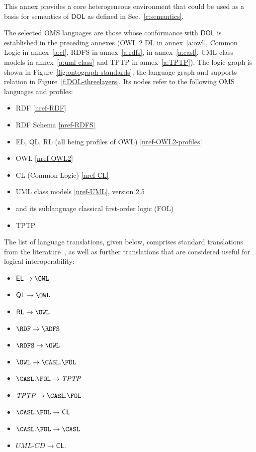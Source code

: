 \documentclass[10pt, a4paper]{isov2}
\newcommand*{\CL}{\ensuremath{\mathsf{CL}}\xspace}
\newcommand{\QL}{\ensuremath{\mathsf{QL}}\xspace}
\newcommand{\RL}{\ensuremath{\mathsf{RL}}\xspace}
\newcommand{\EL}{\ensuremath{\mathsf{EL}}\xspace}
\newcommand*{\DOL}{\ensuremath{\mathsf{DOL}}\xspace}
\renewcommand{\annexrefname}{annex}
\renewcommand{\figurerefname}{Figure}
\renewcommand{\noterefname}{note}
\renewcommand{\aref}[1]{\annexrefname~\ref{#1}}
\renewcommand{\fref}[1]{\figurerefname~\ref{#1}}
\renewcommand{\nref}[1]{\noterefname~\ref{#1}}
\renewcommand{\nref}[1]{\ref{nref-#1}}
\begin{document}
This annex provides a core heterogeneous environment that could be used as a basis for 
semantics of \DOL as defined in Sec.~\ref{c:semantics}.



 
The selected OMS languages are those whose conformance with \DOL is
established in the preceding annexes (OWL 2 DL in \aref{a:owl}, Common
Logic in \aref{a:cl}, RDFS in \aref{a:rdfs}, \CASL in \aref{a:casl}, UML
class models in \aref{a:uml-class} and TPTP in \aref{a:TPTP}).  The
logic graph is shown in \fref{fig:ontograph-standards}; the language
graph and supports relation in \fref{f:DOL-threelayers}.  Its nodes
refer to the following OMS languages and profiles:
\begin{itemize}
\item RDF \nref{RDF}
\item RDF Schema \nref{RDFS}
\item EL, QL, RL (all being profiles of OWL) \nref{OWL2-profiles}
\item OWL \nref{OWL2}
\item CL (Common Logic) \nref{CL}
\item UML class models \nref{UML}, version 2.5
\item \CASL \cite{CASL-RM} and its sublanguage classical first-order logic (FOL)
\item TPTP
\end{itemize}

The list of language translations, given below, comprises standard
translations from the literature~\cite{OntoGraph,MossakowskiEtAl14b}, as
well as further translations that are considered useful for logical
interoperability:
\begin{itemize}
  \item $\EL \to \OWL$ 
  \item $\QL \to \OWL$
  \item $\RL \to \OWL$
  \item $\RDF \to \RDFS$
  \item $\RDFS \to \OWL$
  \item $\OWL  \to \CASL.\FOL$
  \item $\CASL.\FOL \to \mathit{TPTP}$
  \item $\mathit{TPTP} \to \CASL.\FOL$
  \item $\CASL.\FOL \to \CL$
  \item $\CASL.\FOL \to \CASL$
  \item $\mathit{UML\textit{-}CD} \to \CL$.
\end{itemize}
\end{document}
